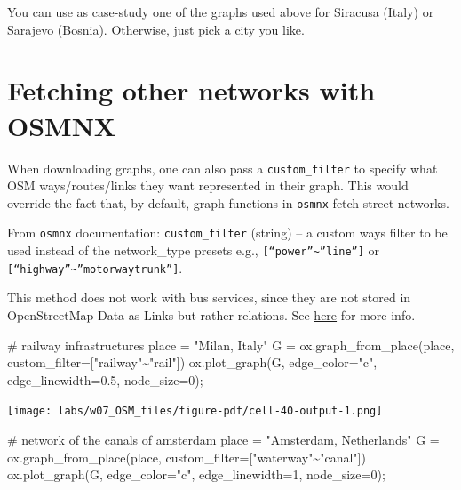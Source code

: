 \documentclass[
  letterpaper,
  DIV=11,
  numbers=noendperiod]{scrreprt}
\newenvironment{Shaded}{\begin{snugshade}}{\end{snugshade}}
\newcommand{\CommentTok}[1]{\textcolor[rgb]{0.37,0.37,0.37}{#1}}
\newcommand{\DecValTok}[1]{\textcolor[rgb]{0.68,0.00,0.00}{#1}}
\newcommand{\FloatTok}[1]{\textcolor[rgb]{0.68,0.00,0.00}{#1}}
\newcommand{\NormalTok}[1]{\textcolor[rgb]{0.00,0.23,0.31}{#1}}
\newcommand{\OperatorTok}[1]{\textcolor[rgb]{0.37,0.37,0.37}{#1}}
\newcommand{\StringTok}[1]{\textcolor[rgb]{0.13,0.47,0.30}{#1}}
\begin{document}
You can use as case-study one of the graphs used above for Siracusa
(Italy) or Sarajevo (Bosnia). Otherwise, just pick a city you like.

\section{Fetching other networks with
OSMNX}\label{fetching-other-networks-with-osmnx}

When downloading graphs, one can also pass a \texttt{custom\_filter} to
specify what OSM ways/routes/links they want represented in their graph.
This would override the fact that, by default, graph functions in
\texttt{osmnx} fetch street networks.

From \texttt{osmnx} documentation: \texttt{custom\_filter} (string) -- a
custom ways filter to be used instead of the network\_type presets e.g.,
\texttt{{[}“power”\textasciitilde{}”line”{]}} or
\texttt{{[}“highway”\textasciitilde{}”motorway\textbar{}trunk”{]}}.

This method does not work with bus services, since they are not stored
in OpenStreetMap Data as Links but rather relations. See
\href{https://wiki.openstreetmap.org/wiki/Buses}{here} for more info.

\begin{Shaded}
\begin{Highlighting}[]
\CommentTok{\# railway infrastructures}
\NormalTok{place }\OperatorTok{=} \StringTok{"Milan, Italy"}
\NormalTok{G }\OperatorTok{=}\NormalTok{ ox.graph\_from\_place(place, custom\_filter}\OperatorTok{=}\StringTok{\textquotesingle{}["railway"\textasciitilde{}"rail"]\textquotesingle{}}\NormalTok{)}
\NormalTok{ox.plot\_graph(G, edge\_color}\OperatorTok{=}\StringTok{"c"}\NormalTok{, edge\_linewidth}\OperatorTok{=}\FloatTok{0.5}\NormalTok{, node\_size}\OperatorTok{=}\DecValTok{0}\NormalTok{)}\OperatorTok{;}
\end{Highlighting}
\end{Shaded}

\texttt{[image: labs/w07\_OSM\_files/figure-pdf/cell-40-output-1.png]}

\begin{Shaded}
\begin{Highlighting}[]
\CommentTok{\# network of the canals of amsterdam}
\NormalTok{place }\OperatorTok{=} \StringTok{"Amsterdam, Netherlands"}
\NormalTok{G }\OperatorTok{=}\NormalTok{ ox.graph\_from\_place(place, custom\_filter}\OperatorTok{=}\StringTok{\textquotesingle{}["waterway"\textasciitilde{}"canal"]\textquotesingle{}}\NormalTok{)}
\NormalTok{ox.plot\_graph(G, edge\_color}\OperatorTok{=}\StringTok{"c"}\NormalTok{, edge\_linewidth}\OperatorTok{=}\DecValTok{1}\NormalTok{, node\_size}\OperatorTok{=}\DecValTok{0}\NormalTok{)}\OperatorTok{;}
\end{Highlighting}
\end{Shaded}
\end{document}
